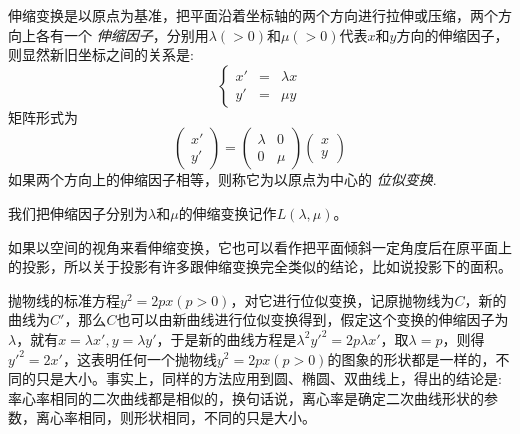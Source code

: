 伸缩变换是以原点为基准，把平面沿着坐标轴的两个方向进行拉伸或压缩，两个方向上各有一个 \emph{伸缩因子}，分别用$\lambda(>0)$和$\mu(>0)$代表$x$和$y$方向的伸缩因子，则显然新旧坐标之间的关系是:
\begin{equation}
  \label{eq:scale-translation-coordinate-formula}
  \left\{
    \begin{array}{ccc}
      x' & = & \lambda x \\
      y' & = & \mu y
    \end{array}
  \right.
\end{equation}
矩阵形式为
\begin{equation*}
  \left(
    \begin{array}{c}
      x' \\
      y'
    \end{array}
  \right)
    =
    \left(
      \begin{array}{cc}
        \lambda & 0 \\
        0 & \mu
      \end{array}
    \right)
  \left(
    \begin{array}{c}
      x \\
      y
    \end{array}
  \right)
\end{equation*}
如果两个方向上的伸缩因子相等，则称它为以原点为中心的 \emph{位似变换}.

我们把伸缩因子分别为$\lambda$和$\mu$的伸缩变换记作$L(\lambda, \mu)$。

如果以空间的视角来看伸缩变换，它也可以看作把平面倾斜一定角度后在原平面上的投影，所以关于投影有许多跟伸缩变换完全类似的结论，比如说投影下的面积。

\begin{example}[二次曲线的离心率决定其形状]
  抛物线的标准方程$y^2=2px(p>0)$，对它进行位似变换，记原抛物线为$C$，新的曲线为$C'$，那么$C$也可以由新曲线进行位似变换得到，假定这个变换的伸缩因子为$\lambda$，就有$x=\lambda x', y=\lambda y'$，于是新的曲线方程是$\lambda^2y'^2=2p\lambda x'$，取$\lambda = p$，则得$y'^2=2x'$，这表明任何一个抛物线$y^2=2px(p>0)$的图象的形状都是一样的，不同的只是大小。事实上，同样的方法应用到圆、椭圆、双曲线上，得出的结论是: 率心率相同的二次曲线都是相似的，换句话说，离心率是确定二次曲线形状的参数，离心率相同，则形状相同，不同的只是大小。
\end{example}

